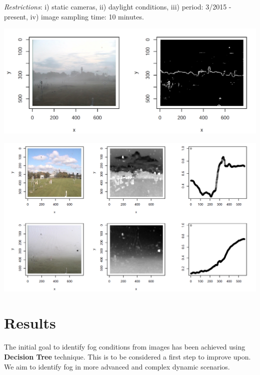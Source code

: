 \documentclass{article}
\begin{document}
\textit{Restrictions}: 
i) static cameras,
ii) daylight conditions,
iii) period: 3/2015 - present, 
iv) image sampling time: 10 minutes.




\begin{minipage}[b]{\columnwidth}
	\begin{center}
	\includegraphics[width=0.95\columnwidth]{edges}
	\label{figEdges}
	\end{center}
\end{minipage}

\begin{minipage}[b]{\columnwidth}
	\begin{center}
	\includegraphics[width=0.95\columnwidth]{transmission}
	\label{figTransmission}
	\end{center}
\end{minipage}
\vspace*{-5cm}


\section*{Results}
The initial goal to identify fog conditions from images has been achieved using \textbf{Decision Tree} technique. This is to be considered a first step to improve upon. We aim to identify fog in more advanced and complex dynamic scenarios.
\end{document}
